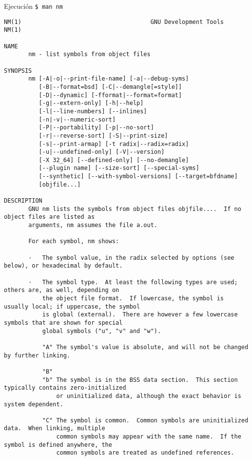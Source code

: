 \documentclass[aspectratio=169]{beamer}
\begin{document}
\begin{frame}[fragile,t]{Ejecución}
    \small
    \verb|$ man nm|\\
    \vspace{0.2cm}
    \tiny
\begin{verbatim}
NM(1)                                     GNU Development Tools                                    NM(1)

NAME
       nm - list symbols from object files

SYNOPSIS
       nm [-A|-o|--print-file-name] [-a|--debug-syms]
          [-B|--format=bsd] [-C|--demangle[=style]]
          [-D|--dynamic] [-fformat|--format=format]
          [-g|--extern-only] [-h|--help]
          [-l|--line-numbers] [--inlines]
          [-n|-v|--numeric-sort]
          [-P|--portability] [-p|--no-sort]
          [-r|--reverse-sort] [-S|--print-size]
          [-s|--print-armap] [-t radix|--radix=radix]
          [-u|--undefined-only] [-V|--version]
          [-X 32_64] [--defined-only] [--no-demangle]
          [--plugin name] [--size-sort] [--special-syms]
          [--synthetic] [--with-symbol-versions] [--target=bfdname]
          [objfile...]

DESCRIPTION
       GNU nm lists the symbols from object files objfile....  If no object files are listed as
       arguments, nm assumes the file a.out.

       For each symbol, nm shows:

       ·   The symbol value, in the radix selected by options (see below), or hexadecimal by default.

       ·   The symbol type.  At least the following types are used; others are, as well, depending on
           the object file format.  If lowercase, the symbol is usually local; if uppercase, the symbol
           is global (external).  There are however a few lowercase symbols that are shown for special
           global symbols ("u", "v" and "w").

           "A" The symbol's value is absolute, and will not be changed by further linking.

           "B"
           "b" The symbol is in the BSS data section.  This section typically contains zero-initialized
               or uninitialized data, although the exact behavior is system dependent.

           "C" The symbol is common.  Common symbols are uninitialized data.  When linking, multiple
               common symbols may appear with the same name.  If the symbol is defined anywhere, the
               common symbols are treated as undefined references.

\end{verbatim}
\end{frame}
\end{document}
